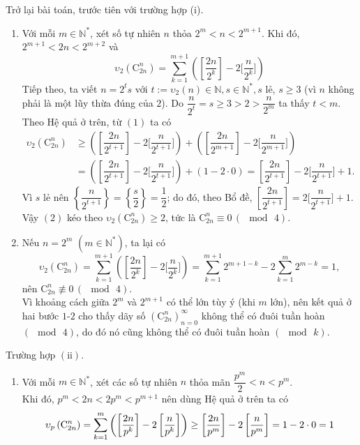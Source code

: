 \begin{bt}
{		Trở lại bài toán, trước tiên với trường hợp (i).
		\begin{enumerate}
			\item Với mỗi $m\in \mathbb{N}^*$, xét số tự nhiên $n$ thỏa $2^m<n<2^{m+1}$. Khi đó, $2^{m+1}<2n<2^{m+2}$ và
			\[\upsilon_2 \left( \mathrm{C}_{2n}^n\right)=\sum\limits_{k=1}^{m+1}\left(\left[\dfrac{2n}{2^k}\right]-2 \bigg[\dfrac{n}{2^k}\bigg]\right) \tag{1} \]
			Tiếp theo, ta viết $n=2^ts$ với $t:=\upsilon_2(n)\in\mathbb{N},s\in\mathbb{N}^*,s$ lẻ, $s\ge 3$ (vì $n$ không phải là một lũy thừa đúng của $2$). Do $\dfrac{n}{2^t}=s\ge 3>2>\dfrac{n}{2^m}$ ta thấy $t<m$. Theo Hệ quả ở trên, từ $(1)$ ta có
			\begin{align*}
			\upsilon_2\left( \mathrm{C}_{2n}^n\right) & \ge \left(\left[\dfrac{2n}{2^{t+1}}\right]-2 \bigg[\dfrac{n}{2^{t+1}}\bigg]\right)+\left(\left[\dfrac{2n}{2^{m+1}}\right]-2 \bigg[\dfrac{n}{2^{m+1}}\bigg]\right)\\
			&=\left(\left[\dfrac{2n}{2^{t+1}}\right]-2 \bigg[\dfrac{n}{2^{t+1}}\bigg]\right) +(1-2\cdot 0)=\left[\dfrac{2n}{2^{t+1}}\right] - 2 \bigg[\dfrac{n}{2^{t+1}}\bigg]+1.\tag{2}
			\end{align*}
			Vì $s$ lẻ nên $\left\{\dfrac{n}{2^{t+1}}\right\}=\left\{\dfrac{s}{2}\right\}=\dfrac{1}{2}$; do đó, theo Bổ đề, $\left[\dfrac{2n}{2^{t+1}}\right]=2\bigg[\dfrac{n}{2^{t+1}}\bigg]+1$. Vậy $(2)$ kéo theo $\upsilon_2 \left( \mathrm{C}_{2n}^n\right)\ge 2$, tức là $\mathrm{C}_{2n}^n\equiv 0\,(\mod\,4)$.
			\item Nếu $n=2^m\,\, (m\in\mathbb{N}^*)$, ta lại có
			\[\upsilon_2 \left( \mathrm{C}_{2n}^n\right)=\sum\limits_{k=1}^{m+1}\left(\left[\dfrac{2n}{2^k}\right]-2 \bigg[\dfrac{n}{2^k}\bigg]\right)=\sum\limits_{k=1}^{m+1}2^{m+1-k}-2\sum\limits_{k=1}^m 2^{m-k}=1,\]
			nên $\mathrm{C}_{2n}^n\not\equiv 0\,(\mod\,4)$.\\
			Vì khoảng cách giữa $2^m$ và $2^{m+1}$ có thể lớn tùy ý (khi $m$ lớn), nên kết quả ở hai bước $1$-$2$ cho thấy dãy số $\left(\mathrm{C}_{2n}^n\right)_{n=0}^{\infty}$ không thể có đuôi tuần hoàn $(\mod\,4)$, do đó nó cũng không thể có đuôi tuần hoàn $(\mod\, k)$.
		\end{enumerate}
		Trường hợp $(\mathrm{ii})$.
		\begin{enumerate}
			\item Với mỗi $m\in\mathbb{N}^*$, xét các số tự nhiên $n$ thỏa mãn $\dfrac{p^m}{2}<n<p^m$.\\
			Khi đó, $p^m<2n<2p^m<p^{m+1}$ nên dùng Hệ quả ở trên ta có
			\[\allowdisplaybreaks\upsilon_p\left(\mathrm{C}_{2n}^n\right)=\sum\limits_{k=1}^m\left(\left[\dfrac{2n}{p^k}\right]-2\left[\dfrac{n}{p^k}\right]\right)\ge \left[  \dfrac{2n}{p^m}\right]-2\left[\dfrac{n}{p^m}\right]=1-2\cdot 0 =1\]

\end{enumerate}}
\end{bt}
